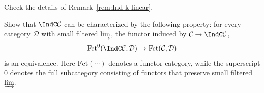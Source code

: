\begin{Exercises}
	\item Check the details of Remark~\ref{rem:Ind-k-linear}.

	\item Show that $\IndC\mathcal{C}$ can be characterized by the following property: for every category $\mathcal{D}$ with small filtered $\varinjlim$, the functor induced by $\mathcal{C}\to\IndC\mathcal{C}$,
	\[ \mathrm{Fct}^0(\IndC\mathcal{C}, \mathcal{D}) \to \mathrm{Fct}(\mathcal{C}, \mathcal{D}) \]
	is an equivalence. Here $\mathrm{Fct}(\cdots)$ denotes a functor category, while the superscript $0$ denotes the full subcategory consisting of functors that preserve small filtered $\varinjlim$.
\end{Exercises}
